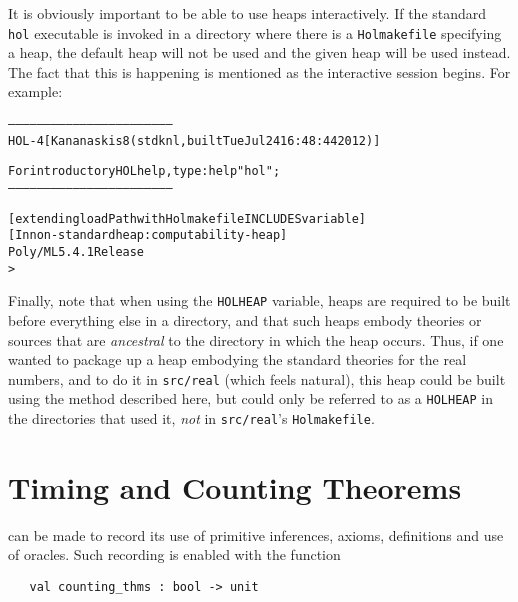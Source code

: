 It is obviously important to be able to use heaps interactively.
If the standard \texttt{hol} executable is invoked in a directory where there is a \texttt{Holmakefile} specifying a heap, the default heap will not be used and the given heap will be used instead.
The fact that this is happening is mentioned as the interactive session begins.
For example:
\begin{samepage}
\begin{alltt}
---------------------------------------------------------------------
       HOL-4 [Kananaskis 8 (stdknl, built Tue Jul 24 16:48:44 2012)]

       For introductory HOL help, type: help "hol";
---------------------------------------------------------------------

[extending loadPath with Holmakefile INCLUDES variable]
[In non-standard heap: computability-heap]
Poly/ML 5.4.1 Release
>
\end{alltt}
\end{samepage}

Finally, note that when using the \texttt{HOLHEAP} variable, heaps are required to be built before everything else in a directory, and that such heaps embody theories or \ML{} sources that are \emph{ancestral} to the directory in which the heap occurs.
Thus, if one wanted to package up a heap embodying the standard theories for the real numbers, and to do it in \texttt{src/real} (which feels natural), this heap could be built using the method described here, but could only be referred to as a \texttt{HOLHEAP} in the directories that used it, \emph{not} in \texttt{src/real}'s \texttt{Holmakefile}.

\section{Timing and Counting Theorems}



\HOL{} can be made to record its use of primitive
inferences, axioms, definitions and use of oracles.  Such recording is
enabled with the function

\begin{holboxed}
\begin{verbatim}
   val counting_thms : bool -> unit
\end{verbatim}
\end{holboxed}

